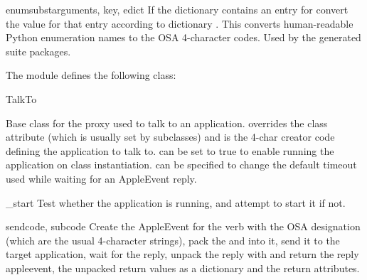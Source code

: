 \begin{funcdesc}{enumsubst}{arguments, key, edict}
If the  dictionary contains an entry for 
convert the value for that entry according to dictionary .
This converts human-readable Python enumeration names to the OSA 4-character
codes.
Used by the generated suite
packages.
\end{funcdesc}

The  module defines the following class:

\begin{classdesc}{TalkTo}{}

Base class for the proxy used to talk to an application. 
overrides the class attribute  (which is usually set by subclasses)
and is the 4-char creator code defining the application to talk to.
 can be set to true to enable running the application on
class instantiation.  can be specified to change the
default timeout used while waiting for an AppleEvent reply.
\end{classdesc}

\begin{methoddesc}{_start}{}
Test whether the application is running, and attempt to start it if not.
\end{methoddesc}

\begin{methoddesc}{send}{code, subcode}
Create the AppleEvent  for the verb with
the OSA designation  (which are the usual 4-character
strings), pack the  and  into it, send it
to the target application, wait for the reply, unpack the reply with
 and return the reply appleevent, the unpacked return values
as a dictionary and the return attributes.
\end{methoddesc}
